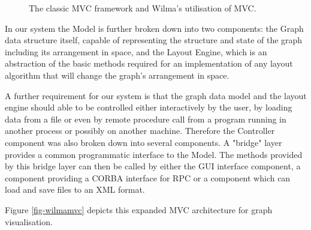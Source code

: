 \documentclass[runningheads]{cl2emult}
\begin{document}
\begin{figure}[h]
  \centering
  \caption{The classic MVC framework and Wilma's utilisation of MVC.}
\end{figure}

In our system the Model is further broken down into two components:
the Graph data structure itself, capable of representing the structure
and state of the graph including its arrangement in space, and
the Layout Engine, which is an abstraction of the basic methods required for
an implementation of any layout algorithm that will change the graph's
arrangement in space.

A further requirement for our system is that the graph data model and
the layout engine should able to be controlled either interactively by
the user, by loading data from a file or even by remote
procedure call from a program running in another process or possibly on
another machine.  Therefore the Controller component was also broken
down into several components.  A "bridge" layer provides a common
programmatic interface to the Model.  The methods provided by this
bridge layer can then be called by either the GUI interface component,
a component providing a CORBA interface for RPC or a component which
can load and save files to an XML format.


Figure \ref{fig-wilmamvc} depicts this expanded MVC architecture for graph
visualisation. 
\end{document}
